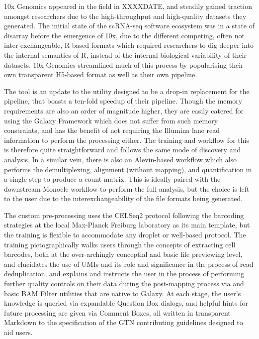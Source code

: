 \documentclass[a4paper,num-refs]{oup-contemporary}
\begin{document}
10x Genomics appeared in the field in XXXXDATE, and steadily gained traction amongst researchers due to the high-throughput and high-quality datasets they generated. The initial state of the scRNA-seq software ecosystem was in a state of disarray before the emergence of 10x, due to the different competing, often not inter-exchangeable, R-based formats which required researchers to dig deeper into the internal semantics of R, instead of the internal biological variability of their datasets. 10x Genomics streamlined much of this process by popularising their own transparent H5-based format as well as their own  pipeline.

The  tool is an update to the  utility designed to be a drop-in replacement for the  pipeline, that boasts a ten-fold speedup of their pipeline. Though the memory requirements are also an order of magnitude higher, they are easily catered for using the Galaxy Framework which does not suffer from such memory constraints, and has the benefit of not requiring the Illumina lane read information to perform the processing either. The training and workflow for this is therefore quite straightforward and follows the same mode of discovery and analysis.
In a similar vein, there is also an Alevin-based workflow which also performs the demultiplexing, alignment (without mapping), and quantification in a single step to produce a count matrix. This is ideally paired with the downstream Monocle workflow to perform the full analysis, but the choice is left to the user due to the interexchangeability of the file formats being generated.

The custom pre-processing uses the CELSeq2 protocol following the barcoding strategies at the local Max-Planck Freiburg laboratory as its main template, but the training is flexible to accommodate any droplet or well-based protocol. The training pictographically walks users through the concepts of extracting cell barcodes, both at the over-archingly conceptial and basic file previewing level, and elucidates the use of UMIs and its role and significance in the process of read deduplication, and explains and instructs the user in the process of performing further quality controls on their data during the post-mapping process via  and basic BAM Filter utilities that are native to Galaxy. At each stage, the user's knowledge is queried via expandable Question Box dialogs, and helpful hints for future processing are given via Comment Boxes, all written in transparent Markdown to the specification of the GTN contributing guidelines designed to aid users.
\end{document}
